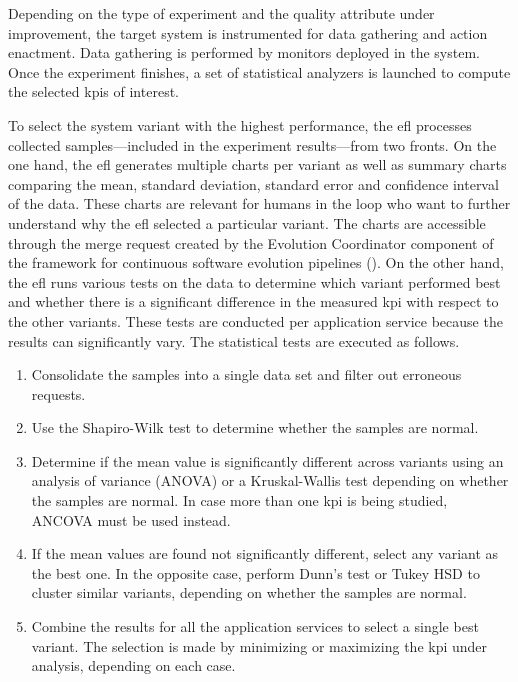 
Depending on the type of experiment and the quality attribute under improvement, the target system is instrumented for data gathering and action enactment. Data gathering is performed by monitors deployed in the system. Once the experiment finishes, a set of statistical analyzers is launched to compute the selected \glspl{kpi} of interest.

To select the system variant with the highest performance, the \gls{efl} processes collected samples---included in the experiment results---from two fronts. On the one hand, the \gls{efl} generates multiple charts per variant as well as summary charts comparing the mean, standard deviation, standard error and confidence interval of the data. These charts are relevant for humans in the loop who want to further understand why the \gls{efl} selected a particular variant. The charts are accessible through the merge request created by the Evolution Coordinator component of the framework for continuous software evolution pipelines (). On the other hand, the \gls{efl} runs various tests on the data to determine which variant performed best and whether there is a significant difference in the measured \gls{kpi} with respect to the other variants. These tests are conducted per application service because the results can significantly vary. The statistical tests are executed as follows.

\begin{enumerate}
	\item Consolidate the samples into a single data set and filter out erroneous requests.
	\item Use the Shapiro-Wilk test to determine whether the samples are normal.
	\item Determine if the mean value is significantly different across variants using an analysis of variance (ANOVA) or a Kruskal-Wallis test depending on whether the samples are normal. In case more than one \gls{kpi} is being studied, ANCOVA must be used instead.
	\item If the mean values are found not significantly different, select any variant as the best one. In the opposite case, perform Dunn’s test or Tukey HSD to cluster similar variants, depending on whether the samples are normal.
	\item Combine the results for all the application services to select a single best variant. The selection is made by minimizing or maximizing the \gls{kpi} under analysis, depending on each case.
\end{enumerate}

